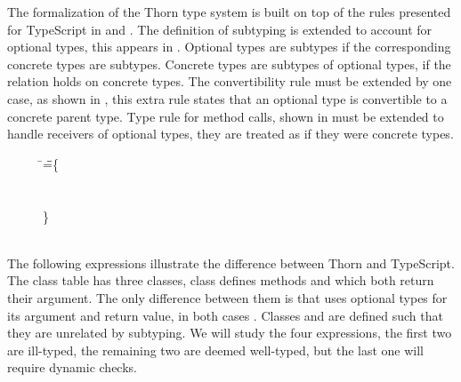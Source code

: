 \documentclass{tex/llncs}
\begin{document}
The formalization of the Thorn type system is built on top of the rules
presented for TypeScript in  and . The
definition of subtyping is extended to account for optional types, this 
appears in . Optional types are subtypes if the corresponding
concrete types are subtypes. Concrete types are subtypes of optional types,
if the relation holds on concrete types. The convertibility rule must be
extended by one case, as shown in , this extra rule states
that an optional type is convertible to a concrete parent type. Type rule
for method calls, shown in  must be extended to handle
receivers of optional types, they are treated as if they were concrete
types.



\begin{figure}[!h]
	\small
	\begin{tabbing}
		\HS\HS\HS\=  
		\Call{\New\A{}}\n{\New\D{}}\HS\HS\HS\HS\HS\HS\HS\HS\HS\HS\HS\HS\HS \WHERE \HS\K\HS=\HS\=\class\= \A \{
		\\\>
		\Call{\New\A{}}\m{\New\D{}}
		\>    \HS  \Mdef \n\x\C\C{~\x~}
		\\\>
		\Call{\New\A{}}\m{\Call{\New\A{}}\n{\New\C{}}}
		\>    \HS \Mdef \m\x{\C} {\C}{~\x~}
		\\\>
		\Call{\New\A{}}\n{\Call{\New\A{}}\m{\New\C{}}}
		\> \}
		\\\>   \> \Class\C{}{\Mdef\mp\x\any\any\x}
		\\\>   \> \Class\D{}{\Mdef\m\x\any\any\x}
		
		
	\end{tabbing}
\end{figure}
\normalsize

The following expressions illustrate the difference between Thorn and
TypeScript.  The class table \K has three classes, class \A defines methods
\m and \n which both return their argument. The only difference between them
is that \m uses optional types for its argument and return value, in both
cases \CW.  Classes \C and \D are defined such that they are unrelated by
subtyping. We will study the four expressions, the first two are ill-typed,
the remaining two are deemed well-typed, but the last one will require
dynamic checks.
\end{document}
